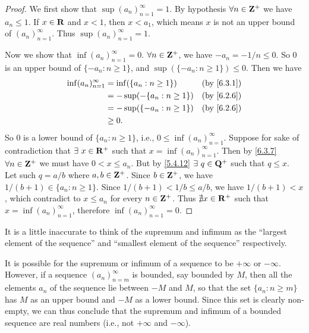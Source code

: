 \begin{proof}
  We first show that \(\sup(a_n)_{n = 1}^\infty = 1\).
  By hypothesis \(\forall n \in \mathbf{Z}^+\) we have \(a_n \leq 1\).
  If \(x \in \mathbf{R}\) and \(x < 1\), then \(x < a_1\), which means \(x\) is not an upper bound of \((a_n)_{n = 1}^\infty\).
  Thus \(\sup(a_n)_{n = 1}^\infty = 1\).

  Now we show that \(\inf(a_n)_{n = 1}^\infty = 0\).
  \(\forall n \in \mathbf{Z}^+\), we have \(-a_n = -1 / n \leq 0\).
  So \(0\) is an upper bound of \(\{-a_n : n \geq 1\}\), and \(\sup(\{-a_n : n \geq 1\}) \leq 0\).
  Then we have
  \begin{align*}
    \inf(a_n)_{n = 1}^\infty & = \inf(\{a_n : n \geq 1\})   & \text{(by \cref{6.3.1})} \\
                             & = -\sup(-\{a_n : n \geq 1\}) & \text{(by \cref{6.2.6})} \\
                             & = -\sup(\{-a_n : n \geq 1\}) & \text{(by \cref{6.2.6})} \\
                             & \geq 0.
  \end{align*}
  So \(0\) is a lower bound of \(\{a_n : n \geq 1\}\), i.e., \(0 \leq \inf(a_n)_{n = 1}^\infty\).
  Suppose for sake of contradiction that \(\exists\ x \in \mathbf{R}^+\) such that \(x = \inf(a_n)_{n = 1}^\infty\).
  Then by \cref{6.3.7} \(\forall n \in \mathbf{Z}^+\) we must have \(0 < x \leq a_n\).
  But by \cref{5.4.12} \(\exists\ q \in \Q^+\) such that \(q \leq x\).
  Let such \(q = a / b\) where \(a, b \in \mathbf{Z}^+\).
  Since \(b \in \mathbf{Z}^+\), we have \(1 / (b + 1) \in \{a_n : n \geq 1\}\).
  Since \(1 / (b + 1) < 1 / b \leq a / b\), we have \(1 / (b + 1) < x\), which contradict to \(x \leq a_n\) for every \(n \in \mathbf{Z}^+\).
  Thus \(\nexists x \in \mathbf{R}^+\) such that \(x = \inf(a_n)_{n = 1}^\infty\), therefore \(\inf(a_n)_{n = 1}^\infty = 0\).
\end{proof}

\begin{note}
  It is a little inaccurate to think of the supremum and infimum as the ``largest element of the sequence'' and ``smallest element of the sequence'' respectively.
\end{note}

\begin{note}
  It is possible for the supremum or infimum of a sequence to be \(+\infty\) or \(-\infty\).
  However, if a sequence \((a_n)_{n = m}^\infty\) is bounded, say bounded by \(M\), then all the elements \(a_n\) of the sequence lie between \(-M\) and \(M\), so that the set \(\{a_n : n \geq m\}\) has \(M\) as an upper bound and \(-M\) as a lower bound.
  Since this set is clearly non-empty, we can thus conclude that the supremum and infimum of a bounded sequence are real numbers (i.e., not \(+\infty\) and \(-\infty\)).
\end{note}

